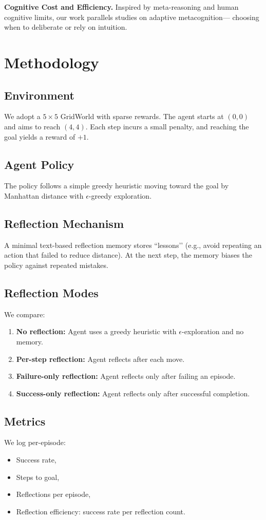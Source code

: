 \documentclass[conference]{IEEEtran}
\begin{document}
\textbf{Cognitive Cost and Efficiency.}
Inspired by meta-reasoning and human cognitive limits,
our work parallels studies on adaptive metacognition---
choosing when to deliberate or rely on intuition.

\section{Methodology}
\subsection{Environment}
We adopt a $5\times5$ GridWorld with sparse rewards.
The agent starts at $(0,0)$ and aims to reach $(4,4)$.
Each step incurs a small penalty, and reaching the goal yields a reward of $+1$.

\subsection{Agent Policy}
The policy follows a simple greedy heuristic
moving toward the goal by Manhattan distance with $\epsilon$-greedy exploration.

\subsection{Reflection Mechanism}
A minimal text-based reflection memory stores ``lessons’’
(e.g., avoid repeating an action that failed to reduce distance).
At the next step, the memory biases the policy against repeated mistakes.

\subsection{Reflection Modes}
We compare:
\begin{enumerate}
  \item \textbf{No reflection:} Agent uses a greedy heuristic with $\epsilon$-exploration and no memory.\n  \item \textbf{Per-step reflection:} Agent reflects after each move.
  \item \textbf{Failure-only reflection:} Agent reflects only after failing an episode.
  \item \textbf{Success-only reflection:} Agent reflects only after successful completion.
\end{enumerate}

\subsection{Metrics}
We log per-episode:
\begin{itemize}
  \item Success rate,
  \item Steps to goal,
  \item Reflections per episode,
  \item Reflection efficiency: success rate per reflection count.
\end{itemize}
\end{document}
